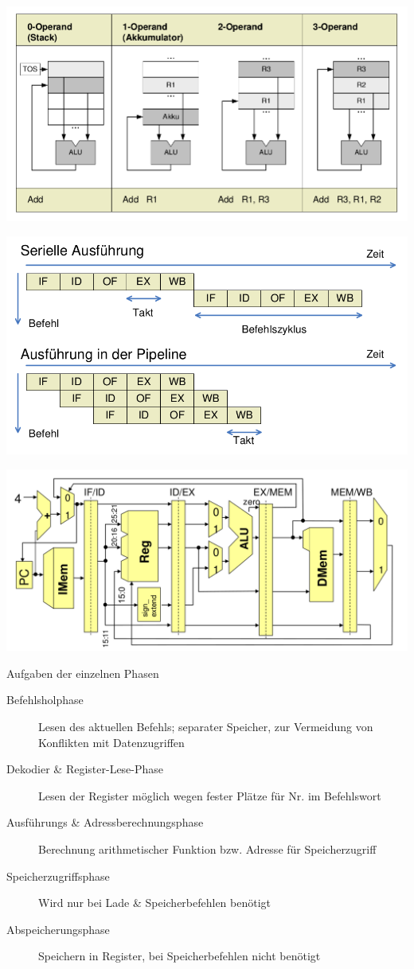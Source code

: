 \documentclass[10pt,landscape]{article}
\begin{document}
\begin{multicols}{3}
  \includegraphics[width=\textwidth/4]{Assets/RA2_Operanden.png}
  
  \includegraphics[width=\textwidth/4]{Assets/RA2_pipelineCPU.png}
  
  \includegraphics[width=\textwidth/4]{Assets/RA2_mehrzyklenCPU.png}
  
  Aufgaben der einzelnen Phasen
  \begin{description}
    \item[Befehlsholphase] Lesen des aktuellen Befehls; separater Speicher, zur Vermeidung von Konflikten mit Datenzugriffen
    \item[Dekodier \& Register-Lese-Phase] Lesen der Register möglich wegen fester Plätze für Nr. im Befehlswort
    \item[Ausführungs \& Adressberechnungsphase] Berechnung arithmetischer Funktion bzw. Adresse für Speicherzugriff
    \item[Speicherzugriffsphase] Wird nur bei Lade \& Speicherbefehlen benötigt
    \item[Abspeicherungsphase] Speichern in Register, bei Speicherbefehlen nicht benötigt
  \end{description}
  

\end{multicols}
\end{document}
